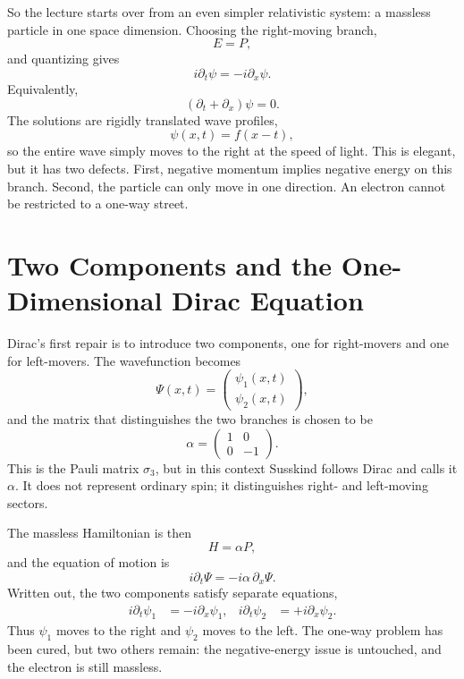 So the lecture starts over from an even simpler relativistic system: a massless particle in one space dimension. Choosing the right-moving branch,
\begin{equation}
E=P,
\end{equation}
and quantizing gives
\begin{equation}
i\partial_t\psi=-i\partial_x\psi.
\end{equation}
Equivalently,
\begin{equation}
(\partial_t+\partial_x)\psi=0.
\end{equation}
The solutions are rigidly translated wave profiles,
\begin{equation}
\psi(x,t)=f(x-t),
\end{equation}
so the entire wave simply moves to the right at the speed of light. This is elegant, but it has two defects. First, negative momentum implies negative energy on this branch. Second, the particle can only move in one direction. An electron cannot be restricted to a one-way street.

\section{Two Components and the One-Dimensional Dirac Equation}

Dirac's first repair is to introduce two components, one for right-movers and one for left-movers. The wavefunction becomes
\begin{equation}
\Psi(x,t)=
\begin{pmatrix}
\psi_1(x,t)\\[4pt]
\psi_2(x,t)
\end{pmatrix},
\end{equation}
and the matrix that distinguishes the two branches is chosen to be
\begin{equation}
\alpha=
\begin{pmatrix}
1 & 0\\
0 & -1
\end{pmatrix}.
\end{equation}
This is the Pauli matrix \(\sigma_3\), but in this context Susskind follows Dirac and calls it \(\alpha\). It does not represent ordinary spin; it distinguishes right- and left-moving sectors.

The massless Hamiltonian is then
\begin{equation}
H=\alpha P,
\end{equation}
and the equation of motion is
\begin{equation}
i\partial_t\Psi=-i\alpha\,\partial_x\Psi.
\end{equation}
Written out, the two components satisfy separate equations,
\begin{align}
i\partial_t\psi_1&=-i\partial_x\psi_1,
&
i\partial_t\psi_2&=+i\partial_x\psi_2.
\end{align}
Thus \(\psi_1\) moves to the right and \(\psi_2\) moves to the left. The one-way problem has been cured, but two others remain: the negative-energy issue is untouched, and the electron is still massless.

